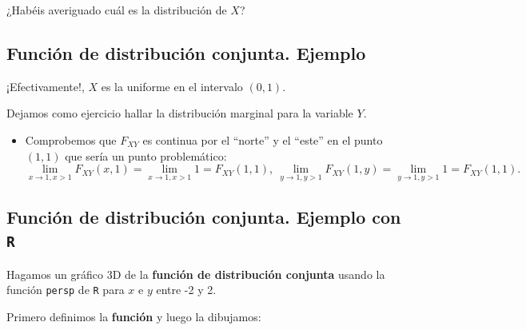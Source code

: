 \documentclass[]{book}
\providecommand{\tightlist}{%
  \setlength{\itemsep}{0pt}\setlength{\parskip}{0pt}}
\begin{document}
¿Habéis averiguado cuál es la distribución de \(X\)?

\hypertarget{funciuxf3n-de-distribuciuxf3n-conjunta.-ejemplo-3}{%
\subsection{Función de distribución conjunta. Ejemplo}\label{funciuxf3n-de-distribuciuxf3n-conjunta.-ejemplo-3}}

¡Efectivamente!, \(X\) es la uniforme en el intervalo \((0,1)\).

Dejamos como ejercicio hallar la distribución marginal para la variable \(Y\).

\begin{itemize}
\tightlist
\item
  Comprobemos que \(F_{XY}\) es continua por el ``norte'' y el ``este'' en el punto \((1,1)\) que sería un punto problemático:
  \[
  \lim_{x\to 1,x> 1} F_{XY}(x,1)=\lim_{x\to 1,x> 1} 1  = F_{XY}(1,1),\ \lim_{y\to 1,y> 1} F_{XY}(1,y)=\lim_{y\to 1,y> 1} 1  = F_{XY}(1,1).
  \]
\end{itemize}

\hypertarget{funciuxf3n-de-distribuciuxf3n-conjunta.-ejemplo-con-r}{%
\subsection{\texorpdfstring{Función de distribución conjunta. Ejemplo con \texttt{R}}{Función de distribución conjunta. Ejemplo con R}}\label{funciuxf3n-de-distribuciuxf3n-conjunta.-ejemplo-con-r}}

Hagamos un gráfico 3D de la \textbf{función de distribución conjunta} usando la función \texttt{persp} de \texttt{R} para \(x\) e \(y\) entre -2 y 2.

Primero definimos la \textbf{función} y luego la dibujamos:
\end{document}
